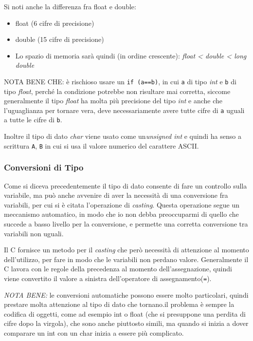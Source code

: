 \documentclass[
]{article}
\begin{document}
Si noti anche la differenza fra float e double:

\begin{itemize}
\item
  float (6 cifre di precisione)
\item
  double (15 cifre di precisione)
\item
  Lo spazio di memoria sarà quindi (in ordine crescente): \emph{float
  \textless{} double \textless{} long double}
\end{itemize}

NOTA BENE CHE: è rischioso usare un \texttt{if\ (a==b)}, in cui
\texttt{a} di tipo \emph{int} e \texttt{b} di tipo \emph{float}, perché
la condizione potrebbe non risultare mai corretta, siccome generalmente
il tipo \emph{float} ha molta più precisione del tipo \emph{int} e anche
che l'uguaglianza per tornare vera, deve necessariamente avere tutte
cifre di \texttt{a} uguali a tutte le cifre di \texttt{b}.

Inoltre il tipo di dato \emph{char} viene usato come un\emph{unsigned
int} e quindi ha senso a scrittura \texttt{A}, \texttt{B} in cui si usa
il valore numerico del carattere ASCII.

\hypertarget{header-n581}{%
\subsubsection{Conversioni di Tipo}\label{header-n581}}

Come si diceva precedentemente il tipo di dato consente di fare un
controllo sulla variabile, ma può anche avvenire di aver la necessità di
una conversione fra variabili, per cui si è citata l'operazione di
\emph{casting}. Questa operazione segue un meccanismo automatico, in
modo che io non debba preoccuparmi di quello che succede a basso livello
per la conversione, e permette una corretta conversione tra variabili
non uguali.

Il C fornisce un metodo per il \emph{casting} che però necessità di
attenzione al momento dell'utilizzo, per fare in modo che le variabili
non perdano valore. Generalmente il C lavora con le regole della
precedenza al momento dell'assegnazione, quindi viene convertito il
valore a sinistra dell'operatore di assegnamento(\texttt{=}).

\emph{NOTA BENE:} le conversioni automatiche possono essere molto
particolari, quindi prestare molta attenzione al tipo di dato che
tornano.il problema è sempre la codifica di oggetti, come ad esempio int
o float (che si presuppone una perdita di cifre dopo la virgola), che
sono anche piuttosto simili, ma quando si inizia a dover comparare un
int con un char inizia a essere più complicato.
\end{document}

